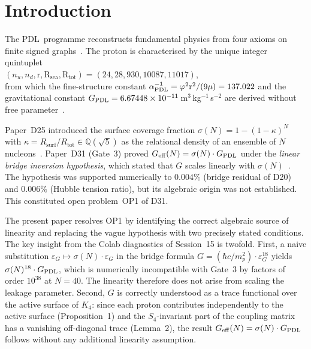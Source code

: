 \documentclass[11pt,a4paper]{article}
\theoremstyle{definition}
\newcommand{\PDL}{\textnormal{PDL}}
\newcommand{\Rsurf}{R_{\mathrm{surf}}}
\newcommand{\Rtot}{R_{\mathrm{tot}}}
\newcommand{\hb}{\hbar}
\newcommand{\vp}{\varphi}
\newcommand{\aPDL}{\alpha_{\PDL}}
\newcommand{\GPDL}{G_{\PDL}}
\newcommand{\Geff}{G_{\mathrm{eff}}}
\newcommand{\sig}{\sigma}
\newcommand{\kap}{\kappa}
\newcommand{\Kfour}{K_4}
\newcommand{\epsg}{\varepsilon_G}
\begin{document}
\section{Introduction}
\label{sec:intro}

The \PDL\ programme reconstructs fundamental physics from four axioms on finite signed graphs~\cite{PDL_Main_2026,PDL_Intro_2026}. The proton is characterised by the unique integer quintuplet \\$(n_u, n_d, \mathrm{r}, \mathrm{R}_{\mathrm{sea}}, \mathrm{R}_{\mathrm{tot}}) = (24, 28, 930, 10087, 11017)$,\\ from which the fine-structure constant $\aPDL^{-1} = \vp^2\mathrm{r}^2/(9\mu) = 137.022$ and the gravitational constant $\GPDL = 6.67448\times10^{-11}$\,m$^3$\,kg$^{-1}$\,s$^{-2}$ are derived without free parameter~\cite{Combinatorial_Proton_v2_2026,Bridge_PDL_2026}.

Paper~D25 introduced the surface coverage fraction $\sig(N) = 1-(1-\kap)^N$ with $\kap = \Rsurf/\Rtot \in \mathbb{Q}(\sqrt{5})$ as the relational density of an ensemble of $N$ nucleons~\cite{Effective_Sigma_PDL_2026}. Paper~D31 (Gate~3) proved $\Geff(N) = \sig(N)\cdot\GPDL$ under the \emph{linear bridge inversion hypothesis}, which stated that $G$ scales linearly with $\sig(N)$~\cite{PDL_D31_2026}. The hypothesis was supported numerically to $0.004\%$ (bridge residual of D20) and $0.006\%$ (Hubble tension ratio), but its algebraic origin was not established. This constituted open problem~OP1 of D31.

The present paper resolves OP1 by identifying the correct algebraic source of linearity and replacing the vague hypothesis with two precisely stated conditions. The key insight from the Colab diagnostics of Session~15 is twofold. First, a naive substitution $\epsg \mapsto \sig(N)\cdot\epsg$ in the bridge formula $G = (\hb c/m_p^2)\cdot\epsg^{18}$ yields $\sig(N)^{18}\cdot\GPDL$, which is numerically incompatible with Gate~3 by factors of order $10^{38}$ at $N=40$. The linearity therefore does not arise from scaling the leakage parameter. Second, $G$ is correctly understood as a trace functional over the active surface of $\Kfour$: since each proton contributes independently to the active surface (Proposition~1) and the $S_4$-invariant part of the coupling matrix has a vanishing off-diagonal trace (Lemma~2), the result $\Geff(N) = \sig(N)\cdot\GPDL$ follows without any additional linearity assumption.
\end{document}
